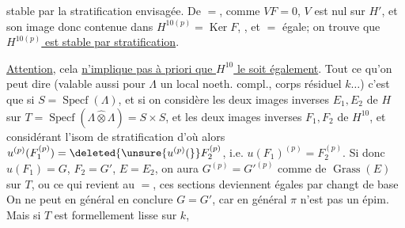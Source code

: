 stable par la stratification envisagée. De $=$, comme $VF=0$, $V$ est nul sur $H'$, et son image donc contenue dans $H^{10(p)}=\operatorname{Ker}F$, , et $=$ égale; on trouve que \uline{$H^{10(p)}$ est stable par  stratification}. 

\uline{Attention}, cela \uline{n'implique pas à priori que $H^{10}$ le soit également}. Tout ce qu'on peut dire (valable aussi pour $\Lambda$ un  local noeth. compl., corps résiduel $k\ldots$) c'est que si $S=\operatorname{Specf}(\Lambda)$, et si on considère les deux images inverses $E_1,E_2$ de $H$ sur  $T=\operatorname{Specf}(\Lambda\widehat\otimes\Lambda)=S\times S$,  et les deux images inverses $F_1,F_2$ de $H^{10}$, et considérant l'isom de stratification
d'où
alors $u^{(p)}(F_1^{(p)})=\deleted{\unsure{u^{(p)}(}}F_2^{(p)}$, i.e. $u(F_1)^{(p)}=F_2^{(p)}$. Si donc $u(F_1)=G$, $F_2=G'$, $E=E_2$, on aura $G^{(p)}=G'^{(p)}$ comme  de $\operatorname{Grass}(E)$ sur $T$, ou ce qui revient au $=$, ces sections deviennent égales par changt de base
On ne peut en général en conclure $G=G'$, car en général $\pi$ n'est pas un épim. Mais si  $T$ est formellement lisse sur $k$,
